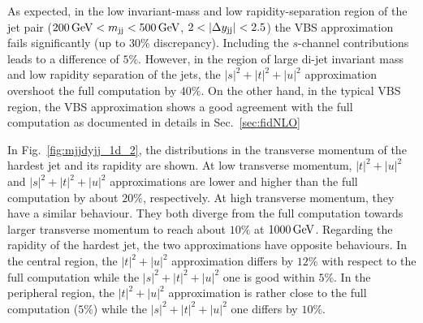 As expected, in the low invariant-mass and low rapidity-separation region of the jet pair ($200 \,\text{GeV} < m_{\text{j}\text{j}} < 500 \,\text{GeV}$, $2<|\Delta y_{\Pj\Pj}|<2.5$) the VBS approximation fails significantly (up to $30\%$ discrepancy).
Including the $s$-channel contributions leads to a difference of $5\%$.
However, in the region of large di-jet invariant mass and low rapidity separation of the jets, the $|s|^2+|t|^2+|u|^2$ approximation overshoot the full computation by $40\%$.
On the other hand, in the typical VBS region, the VBS approximation shows a good agreement with the full computation as documented in details in Sec.~\ref{sec:fidNLO}

% 


In Fig.~\ref{fig:mjjdyjj_1d_2}, the distributions in the transverse momentum of the hardest jet and its rapidity are shown.
At low transverse momentum, $|t|^2+|u|^2$ and $|s|^2+|t|^2+|u|^2$ approximations are lower and higher than the full computation by about $20\%$, respectively.
At high transverse momentum, they have a similar behaviour.
They both diverge from the full computation towards larger transverse momentum to reach about $10\%$ at $1000\,\text{GeV}$.
Regarding the rapidity of the hardest jet, the two approximations have opposite behaviours.
In the central region, the $|t|^2+|u|^2$ approximation differs by $12\%$ with respect to the full computation while the $|s|^2+|t|^2+|u|^2$ one is good within $5\%$.
In the peripheral region, the $|t|^2+|u|^2$ approximation is rather close to the full computation ($5\%$) while the $|s|^2+|t|^2+|u|^2$ one differs by $10\%$.

